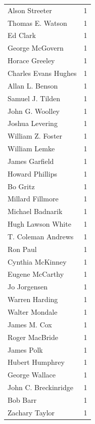 \documentclass[
  letterpaper,
  DIV=11,
  numbers=noendperiod]{scrreprt}
\begin{document}
\begin{tabular}{lr}
Alson Streeter         &          1 \\
Thomas E. Watson       &          1 \\
Ed Clark               &          1 \\
George McGovern        &          1 \\
Horace Greeley         &          1 \\
Charles Evans Hughes   &          1 \\
Allan L. Benson        &          1 \\
Samuel J. Tilden       &          1 \\
John G. Woolley        &          1 \\
Joshua Levering        &          1 \\
William Z. Foster      &          1 \\
William Lemke          &          1 \\
James Garfield         &          1 \\
Howard Phillips        &          1 \\
Bo Gritz               &          1 \\
Millard Fillmore       &          1 \\
Michael Badnarik       &          1 \\
Hugh Lawson White      &          1 \\
T. Coleman Andrews     &          1 \\
Ron Paul               &          1 \\
Cynthia McKinney       &          1 \\
Eugene McCarthy        &          1 \\
Jo Jorgensen           &          1 \\
Warren Harding         &          1 \\
Walter Mondale         &          1 \\
James M. Cox           &          1 \\
Roger MacBride         &          1 \\
James Polk             &          1 \\
Hubert Humphrey        &          1 \\
George Wallace         &          1 \\
John C. Breckinridge   &          1 \\
Bob Barr               &          1 \\
Zachary Taylor         &          1 \\

\end{tabular}
\end{document}

